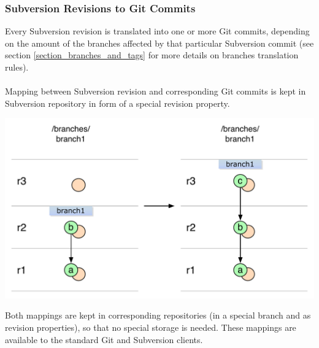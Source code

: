 \subsubsection{Subversion Revisions to Git Commits}

Every Subversion revision is translated into one or more Git commits, depending on the amount of the branches affected by that particular Subversion commit
(see section \ref{section_branches_and_tags} for more details on branches translation rules).\\\\

Mapping between Subversion revision and corresponding Git commits is kept in Subversion repository in form of a special revision property.
\begin{center}
\includegraphics[width=\textwidth]{img/diagrams/single_change_svn_to_git.pdf}%
\label{simple_svn_to_git}%
\end{center}
Both mappings are kept in corresponding repositories (in a special branch and as revision properties), so that no special storage is needed. 
These mappings are available to the standard Git and Subversion clients.